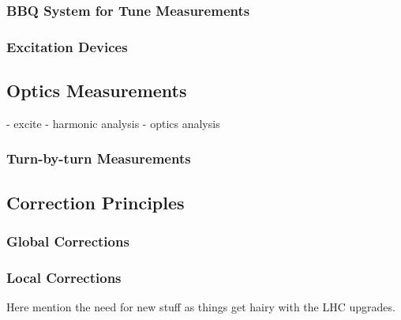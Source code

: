 \subsubsection{BBQ System for Tune Measurements}

\subsubsection{Excitation Devices}

\subsection{Optics Measurements}

- excite
- harmonic analysis
- optics analysis

\subsubsection{Turn-by-turn Measurements}

\subsection{Correction Principles}

\subsubsection{Global Corrections}

\subsubsection{Local Corrections}

Here mention the need for new stuff as things get hairy with the LHC upgrades.